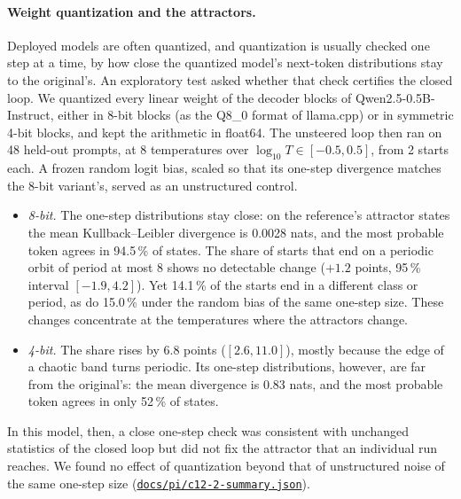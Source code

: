 \documentclass[11pt,letterpaper]{article}
\newcommand{\repourl}{https://github.com/tdj28/neural-shrimp}
\newcommand{\reporef}{arxiv-v1}
\newcommand{\repo}[1]{\href{\repourl/blob/\reporef/#1}{\nolinkurl{#1}}}
\begin{document}
\paragraph{Weight quantization and the attractors.} Deployed models are often quantized, and quantization is usually
checked one step at a time, by how close the quantized model's next-token distributions stay to the original's. An
exploratory test asked whether that check certifies the closed loop. We quantized every linear weight of the decoder
blocks of Qwen2.5-0.5B-Instruct, either in 8-bit blocks (as the Q8\_0 format of llama.cpp) or in symmetric 4-bit
blocks, and kept the arithmetic in float64. The unsteered loop then ran on 48 held-out prompts, at 8 temperatures over
$\log_{10}T\in[-0.5,0.5]$, from 2 starts each. A frozen random logit bias, scaled so that its one-step divergence
matches the 8-bit variant's, served as an unstructured control.
\begin{itemize}
  \item \emph{8-bit.} The one-step distributions stay close: on the reference's attractor states the mean
  Kullback--Leibler divergence is 0.0028 nats, and the most probable token agrees in 94.5\,\% of states. The share
  of starts that end on a periodic orbit of period at most 8 shows no detectable change ($+1.2$ points, 95\,\% interval
  $[-1.9,4.2]$). Yet 14.1\,\% of the starts end in a different class or period, as do 15.0\,\% under the random
  bias of the same one-step size. These changes concentrate at the temperatures where the attractors change.
  \item \emph{4-bit.} The share rises by 6.8 points ($[2.6,11.0]$), mostly because the edge of a chaotic band
  turns periodic. Its one-step distributions, however, are far from the original's: the mean divergence is 0.83 nats,
  and the most probable token agrees in only 52\,\% of states.
\end{itemize}
In this model, then, a close one-step check was consistent with unchanged statistics of the closed loop but did not
fix the attractor that an
individual run reaches. We found no effect of quantization beyond that of unstructured noise of the same one-step size
(\repo{docs/pi/c12-2-summary.json}).
\end{document}
